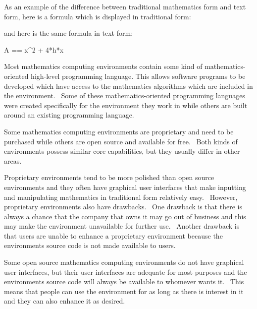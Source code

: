 \documentclass[12pt,twoside]{book}
\begin{document}
\bigskip

As an example of the difference between traditional mathematics form and
text form, here is a formula which is displayed in traditional form:


\bigskip


\bigskip


\bigskip

and here is the same formula in text form:


\bigskip

A == x\^{}2 + 4*h*x


\bigskip

Most mathematics computing environments contain some kind of
mathematics{}-oriented high{}-level programming language. This allows
software programs to be developed which have access to the mathematics
algorithms which are included in the environment. \ Some of these
mathematics{}-oriented programming languages were created specifically
for the environment they work in while others are built around an
existing programming language.


\bigskip

Some mathematics computing environments are proprietary and need to be
purchased while others are open source and available for free. \ Both
kinds of environments possess similar core capabilities, but they
usually differ in other areas.


\bigskip

Proprietary environments tend to be more polished than open source
environments and they often have graphical user interfaces that make
inputting and manipulating mathematics in traditional form relatively
easy. \ However, proprietary environments also have drawbacks. \ One
drawback is that there is always a chance that the company that owns it
may go out of business and this may make the environment unavailable
for further use. \ Another drawback is that users are unable to enhance
a proprietary environment because the environment{\textquotesingle}s
source code is not made available to users.


\bigskip

Some open source mathematics computing environments do not have
graphical user interfaces, but their user interfaces are adequate for
most purposes and the environment{\textquotesingle}s source code will
always be available to whomever wants it. \ This means that people can
use the environment for as long as there is interest in it and they can
also enhance it as desired.
\end{document}
